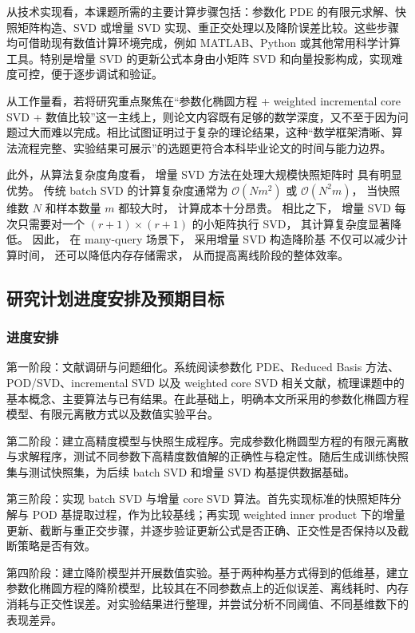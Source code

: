 从技术实现看，本课题所需的主要计算步骤包括：参数化 PDE 的有限元求解、快照矩阵构造、SVD 或增量 SVD 实现、重正交处理以及降阶误差比较。这些步骤均可借助现有数值计算环境完成，例如 MATLAB、Python 或其他常用科学计算工具。特别是增量 SVD 的更新公式本身由小矩阵 SVD 和向量投影构成，实现难度可控，便于逐步调试和验证。

从工作量看，若将研究重点聚焦在“参数化椭圆方程 + weighted incremental core SVD + 数值比较”这一主线上，则论文内容既有足够的数学深度，又不至于因为问题过大而难以完成。相比试图证明过于复杂的理论结果，这种“数学框架清晰、算法流程完整、实验结果可展示”的选题更符合本科毕业论文的时间与能力边界。

此外，从算法复杂度角度看，
增量 SVD 方法在处理大规模快照矩阵时
具有明显优势。
传统 batch SVD 的计算复杂度通常为
$\mathcal O(Nm^2)$ 或 $\mathcal O(N^2m)$，
当快照维数 $N$ 和样本数量 $m$ 都较大时，
计算成本十分昂贵。
相比之下，
增量 SVD 每次只需要对一个
$(r+1)\times(r+1)$ 的小矩阵执行 SVD，
其计算复杂度显著降低。
因此，
在 many-query 场景下，
采用增量 SVD 构造降阶基
不仅可以减少计算时间，
还可以降低内存存储需求，
从而提高离线阶段的整体效率。

\subsection{研究计划进度安排及预期目标}

\subsubsection{进度安排}

第一阶段：文献调研与问题细化。系统阅读参数化 PDE、Reduced Basis 方法、POD/SVD、incremental SVD 以及 weighted core SVD 相关文献，梳理课题中的基本概念、主要算法与已有结果。在此基础上，明确本文所采用的参数化椭圆方程模型、有限元离散方式以及数值实验平台。

第二阶段：建立高精度模型与快照生成程序。完成参数化椭圆型方程的有限元离散与求解程序，测试不同参数下高精度数值解的正确性与稳定性。随后生成训练快照集与测试快照集，为后续 batch SVD 和增量 SVD 构基提供数据基础。

第三阶段：实现 batch SVD 与增量 core SVD 算法。首先实现标准的快照矩阵分解与 POD 基提取过程，作为比较基线；再实现 weighted inner product 下的增量更新、截断与重正交步骤，并逐步验证更新公式是否正确、正交性是否保持以及截断策略是否有效。

第四阶段：建立降阶模型并开展数值实验。基于两种构基方式得到的低维基，建立参数化椭圆方程的降阶模型，比较其在不同参数点上的近似误差、离线耗时、内存消耗与正交性误差。对实验结果进行整理，并尝试分析不同阈值、不同基维数下的表现差异。

